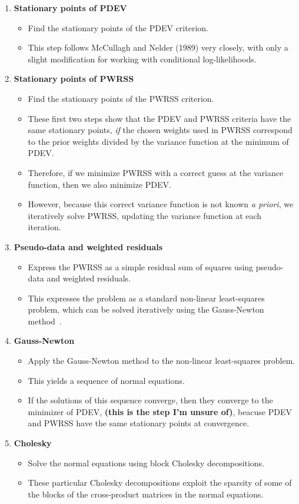 \documentclass{jss}
\begin{document}
\begin{enumerate}
\item \textbf{Stationary points of PDEV}
  \begin{itemize}
    \item Find the stationary points of the PDEV criterion.
    \item This step follows McCullagh and Nelder (1989) very closely,
      with only a slight modification for working with conditional
      log-likelihoods.
  \end{itemize}
\item \textbf{Stationary points of PWRSS}
  \begin{itemize}
    \item Find the stationary points of the PWRSS criterion.
    \item These first two steps show that the PDEV and PWRSS criteria
      have the same stationary points, \emph{if} the chosen weights
      used in PWRSS correspond to the prior weights divided by the
      variance function at the minimum of PDEV.
    \item Therefore, if we minimize PWRSS with a correct guess at
      the variance function, then we also minimize PDEV.
    \item However, because this correct variance function is not known \emph{a priori},
      we iteratively solve PWRSS, updating the variance
      function at each iteration.
  \end{itemize}
\item \textbf{Pseudo-data and weighted residuals}
  \begin{itemize}
    \item Express the PWRSS as a simple residual sum of squares using
      pseudo-data and weighted residuals.
    \item This expresses the problem as a standard non-linear least-squares
      problem, which can be solved iteratively using the Gauss-Newton
      method~\citep[\S2.2.3]{bateswatts88:_nonlin}.
  \end{itemize}
\item \textbf{Gauss-Newton}
  \begin{itemize}
    \item Apply the Gauss-Newton method to the non-linear
      least-squares problem.
    \item This yields a sequence of normal equations.
    \item If the solutions of this sequence converge, then they
      converge to the minimizer of PDEV, \textbf{(this is the step I'm
        unsure of)}, beacuse PDEV and PWRSS have the same stationary
      points at convergence.
  \end{itemize}
\item \textbf{Cholesky}
  \begin{itemize}
    \item Solve the normal equations using block Cholesky
      decompositions.
    \item These particular Cholesky decompositions exploit the sparsity
      of some of the blocks of the cross-product matrices in the
      normal equations.
  \end{itemize}
\end{enumerate}
\end{document}
